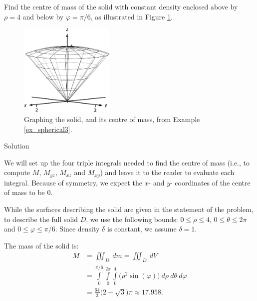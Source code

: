 \begin{example}
\label{ex_spherical3}
Find the centre of mass of the solid with constant density enclosed above by $\rho=4$ and below by $\varphi = \pi/6$, as illustrated in Figure \ref{fig_multiple_34}.


\begin{figure}[H]
	\begin{center}
			\includegraphics[width=0.4\textwidth]{fig_multiple_34}
	\caption{Graphing the solid, and its centre of mass, from Example \ref{ex_spherical3}.}
	\label{fig_multiple_34}
	\end{center}
\end{figure}


Solution 

We will set up the four triple integrals needed to find the centre of mass (i.e., to compute $M$, $M_{yz}$, $M_{xz}$ and $M_{xy}$) and leave it to the reader to evaluate each integral. Because of symmetry, we expect the $x$- and $y$- coordinates of the centre of mass to be 0.

While the surfaces describing the solid are given in the statement of the problem, to describe the full solid $D$, we use the following bounds: $0 \leq \rho \leq 4$, $0 \leq \theta \leq 2\pi$ and $0 \leq \varphi \leq \pi/6$. Since density $\delta$ is constant, we assume $\delta =1$.

The mass of the solid is:
\allowdisplaybreaks
\begin{align*}
M &= \iiint_D\ dm = \iiint_D\ dV\\
	&= \int\limits_0^{\pi/6}\int\limits_0^{2\pi}\int\limits_0^4\big(\rho^2\sin(\varphi)\big)\ d\rho\ d\theta\ d\varphi\\[0.2cm]
	&= \frac{64}3\big(2-\sqrt{3}\big)\pi \approx 17.958.
\end{align*}


\end{example}
